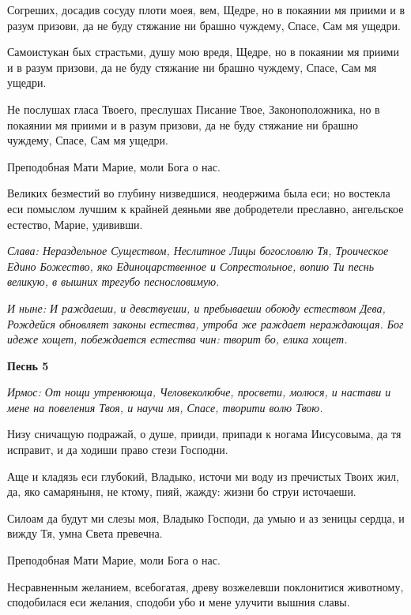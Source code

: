 Согреших, досадив сосуду плоти моея, вем, Щедре, но в покаянии мя приими и в разум призови, да не буду стяжание ни брашно чуждему, Спасе, Сам мя ущедри. 

Самоистукан бых страстьми, душу мою вредя, Щедре, но в покаянии мя приими и в разум призови, да не буду стяжание ни брашно чуждему, Спасе, Сам мя ущедри. 

Не послушах гласа Твоего, преслушах Писание Твое, Законоположника, но в покаянии мя приими и в разум призови, да не буду стяжание ни брашно чуждему, Спасе, Сам мя ущедри. 

\bfseries 

Преподобная Мати Марие, моли Бога о нас.

\normalfont{}

Великих безместий во глубину низведшися, неодержима была еси; но востекла еси помыслом лучшим к крайней деяньми яве добродетели преславно, ангельское естество, Марие, удививши. 

\itshape Слава\normalfont{}: Нераздельное Существом, Неслитное Лицы богословлю Тя, Троическое Едино Божество, яко Единоцарственное и Сопрестольное, вопию Ти песнь великую, в вышних трегубо песнословимую. 

\itshape И ныне\normalfont{}: И раждаеши, и девствуеши, и пребываеши обоюду естеством Дева, Рождейся обновляет законы естества, утроба же раждает нераждающая. Бог идеже хощет, побеждается естества чин: творит бо, елика хощет.


\medskip


\bfseries Песнь 5\normalfont{}

\itshape Ирмос\normalfont{}: От нощи утренююща, Человеколюбче, просвети, молюся, и настави и мене на повеления Твоя, и научи мя, Спасе, творити волю Твою. 

Низу сничащую подражай, о душе, прииди, припади к ногама Иисусовыма, да тя исправит, и да ходиши право стези Господни. 

Аще и кладязь еси глубокий, Владыко, источи ми воду из пречистых Твоих жил, да, яко самаряныня, не ктому, пияй, жажду: жизни бо струи источаеши. 

Силоам да будут ми слезы моя, Владыко Господи, да умыю и аз зеницы сердца, и вижду Тя, умна Света превечна. 

\bfseries 

Преподобная Мати Марие, моли Бога о нас.

\normalfont{}

Несравненным желанием, всебогатая, древу возжелевши поклонитися животному, сподобилася еси желания, сподоби убо и мене улучити вышния славы. 

